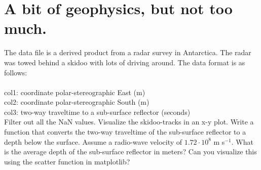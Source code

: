 \section{A bit of geophysics, but not too much.}
The data file is a derived product from a radar survey in Antarctica. The radar was towed behind a skidoo with lots of driving around. The data format is as follows:\\
\\
col1: coordinate polar-stereographic East (m) \\
col2: coordinate polar-stereographic South (m) \\ 
col3: two-way traveltime to a sub-surface reflector (seconds) \\

Filter out all the NaN values. Visualize the skidoo-tracks in an x-y plot. Write a function that converts the two-way traveltime of the sub-surface reflector to a depth below the surface. Assume a radio-wave velocity of $1.72\cdot10^8$ m s$^{-1}$. What is the average depth of the sub-surface reflector in meters? Can you visualize this using the scatter function in matplotlib?
